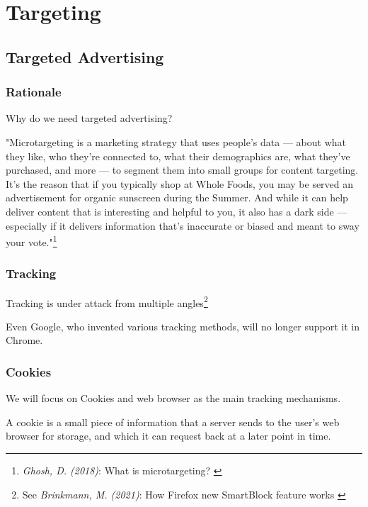 %
%

\pagebreak
\section{Targeting}

\onehalfspacing

\subsection{Targeted Advertising}

\subsubsection{Rationale}

Why do we need targeted advertising?

"Microtargeting is a marketing strategy that uses people’s data — about what they like, who they’re connected to, what their demographics are, what they’ve purchased, and more — to segment them into small groups for content targeting. It’s the reason that if you typically shop at Whole Foods, you may be served an advertisement for organic sunscreen during the Summer. And while it can help deliver content that is interesting and helpful to you, it also has a dark side — especially if it delivers information that’s inaccurate or biased and meant to sway your vote."\footnote{\textit{Ghosh, D. (2018)}: What is microtargeting? \cite{mozillaBlog}}

\subsubsection{Tracking}

Tracking is under attack from multiple angles\footnote{See \textit{Brinkmann, M. (2021)}: How Firefox new SmartBlock feature works \cite{mozillaBlog}}

Even Google, who invented various tracking methods, will no longer support it in Chrome.

\subsubsection{Cookies}

We will focus on Cookies and web browser as the main tracking mechanisms.

A cookie is a small piece of information that a server sends to the user's web browser for storage, and which it can request back at a later point in time.

